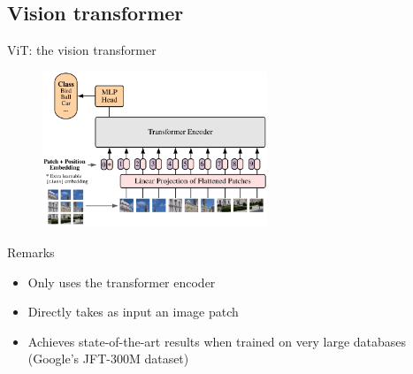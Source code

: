\documentclass[xcolor=pdftex,dvipsnames,table,mathserif]{beamer}
\begin{document}
\subsection{Vision transformer}


\begin{frame}{ViT: the vision transformer~\cite{dosovitskiy_image_2021}}

\begin{figure}[ht]
  \centering
  \includegraphics[width=0.6\textwidth]{vision_transformer}
\end{figure}

\begin{block}{Remarks}
  \begin{itemize}
  \item Only uses the transformer encoder
  \item Directly takes as input an image patch
  \item Achieves state-of-the-art results when trained on very large databases (Google's JFT-300M dataset)
  \end{itemize}
\end{block}


\end{frame}



\end{document}
